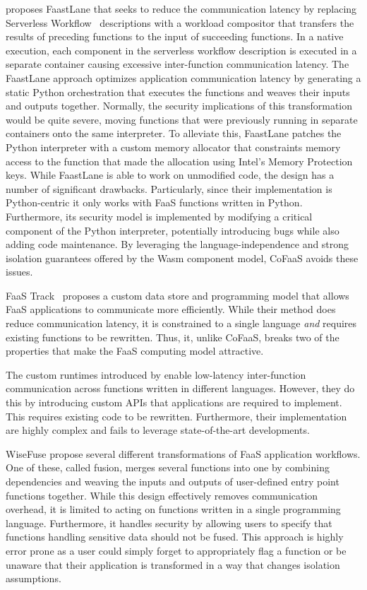 \citet{kotni21_faast} proposes FaastLane that seeks to reduce the communication latency by replacing Serverless Workflow~\cite{slessworkflow} descriptions with a workload compositor that transfers the results of preceding functions to the input of succeeding functions. In a native execution, each component in the serverless workflow description is executed in a separate container causing excessive inter-function communication latency. The FaastLane approach optimizes application communication latency by generating a static Python orchestration that executes the functions and weaves their inputs and outputs together. Normally, the security implications of this transformation would be quite severe, moving functions that were previously running in separate containers onto the same interpreter. To alleviate this, FaastLane patches the Python interpreter with a custom memory allocator that constraints memory access to the function that made the allocation using Intel's Memory Protection keys. While FaastLane is able to work on unmodified code, the design has a number of significant drawbacks. Particularly, since their implementation is Python-centric it only works with FaaS functions written in Python. Furthermore, its security model is implemented by modifying a critical component of the Python interpreter, potentially introducing bugs while also adding code maintenance. By leveraging the language-independence and strong isolation guarantees offered by the Wasm component model, CoFaaS avoids these issues.


FaaS Track~\cite{barcelona-pons19_faas_track} proposes a custom data store and programming model that allows FaaS applications to communicate more efficiently. While their method does reduce communication latency, it is constrained to a single language \emph{and} requires existing functions to be rewritten. Thus, it, unlike CoFaaS, breaks two of the properties that make the FaaS computing model attractive.

The custom runtimes introduced by \cite{jia21_night, shillaker20_faasm} enable low-latency inter-function communication across functions written in different languages. However, they do this by introducing custom APIs that applications are required to implement. This requires existing code to be rewritten. Furthermore, their implementation are highly complex and fails to leverage state-of-the-art developments.

WiseFuse \cite{mahgoub22_wisef} propose several different transformations of FaaS application workflows. One of these, called fusion, merges several functions into one by combining dependencies and weaving the inputs and outputs of user-defined entry point functions together. While this design effectively removes communication overhead, it is limited to acting on functions written in a single programming language. Furthermore, it handles security by allowing users to specify that functions handling sensitive data should not be fused. This approach is highly error prone as a user could simply forget to appropriately flag a function or be unaware that their application is transformed in a way that changes isolation assumptions.



